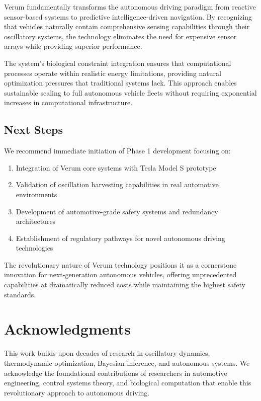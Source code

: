 \documentclass[11pt,a4paper]{article}
\begin{document}
Verum fundamentally transforms the autonomous driving paradigm from reactive sensor-based systems to predictive intelligence-driven navigation. By recognizing that vehicles naturally contain comprehensive sensing capabilities through their oscillatory systems, the technology eliminates the need for expensive sensor arrays while providing superior performance.

The system's biological constraint integration ensures that computational processes operate within realistic energy limitations, providing natural optimization pressures that traditional systems lack. This approach enables sustainable scaling to full autonomous vehicle fleets without requiring exponential increases in computational infrastructure.

\subsection{Next Steps}

We recommend immediate initiation of Phase 1 development focusing on:
\begin{enumerate}
    \item Integration of Verum core systems with Tesla Model S prototype
    \item Validation of oscillation harvesting capabilities in real automotive environments
    \item Development of automotive-grade safety systems and redundancy architectures
    \item Establishment of regulatory pathways for novel autonomous driving technologies
\end{enumerate}

The revolutionary nature of Verum technology positions it as a cornerstone innovation for next-generation autonomous vehicles, offering unprecedented capabilities at dramatically reduced costs while maintaining the highest safety standards.

\section*{Acknowledgments}

This work builds upon decades of research in oscillatory dynamics, thermodynamic optimization, Bayesian inference, and autonomous systems. We acknowledge the foundational contributions of researchers in automotive engineering, control systems theory, and biological computation that enable this revolutionary approach to autonomous driving.
\end{document}
